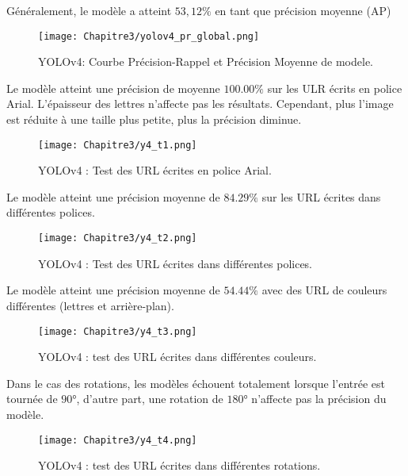           Généralement, le modèle a atteint $53,12\%$ en tant que précision moyenne (AP)
          \begin{figure}[H]
                    \centering
                    \texttt{[image: Chapitre3/yolov4\_pr\_global.png]}
                    \caption{YOLOv4: Courbe Précision-Rappel et Précision Moyenne de modele.}
                    \label{y4_pr}
                    \end{figure}
               
          Le modèle atteint une précision de moyenne $100.00\%$ sur les ULR écrits en police Arial. L'épaisseur des lettres n'affecte pas les résultats. Cependant, plus l'image est réduite à une taille plus petite, plus la précision diminue.
          \begin{figure}[H]
                    \centering
                    \texttt{[image: Chapitre3/y4\_t1.png]}
                    \caption{YOLOv4 : Test des URL écrites en police Arial.}
                    \label{y4_t1}
                    \end{figure}
               
          Le modèle atteint une précision moyenne de $84.29\%$ sur les URL écrites dans différentes polices.
          \begin{figure}[H]
                    \centering
                    \texttt{[image: Chapitre3/y4\_t2.png]}
                    \caption{YOLOv4 : Test des URL écrites dans différentes polices.}
                    \label{y4_t2}
                    \end{figure}

          Le modèle atteint une précision moyenne de $54.44\%$ avec des URL de couleurs différentes (lettres et arrière-plan).
          \begin{figure}[H]
                    \centering
                    \texttt{[image: Chapitre3/y4\_t3.png]}
                    \caption{YOLOv4 : test des URL écrites dans différentes couleurs.}
                    \label{y4_t3}
                    \end{figure}

          Dans le cas des rotations, les modèles échouent totalement lorsque l'entrée est tournée de $90°$, d'autre part, une rotation de $180°$ n'affecte pas la précision du modèle.
          \begin{figure}[H]
                    \centering
                    \texttt{[image: Chapitre3/y4\_t4.png]}
                    \caption{YOLOv4 : test des URL écrites dans différentes rotations.}
                    \label{y4_t4}
                    \end{figure}
               
